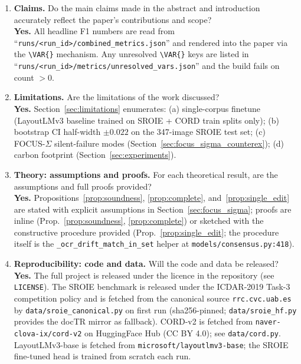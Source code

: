
\begin{enumerate}
\item \textbf{Claims.}  Do the main claims made in the abstract and
introduction accurately reflect the paper's contributions and scope?
\\\textbf{Yes.}  All headline F1 numbers are read from
``\texttt{runs/<run\_id>/combined\_metrics.json}'' and rendered into
the paper via the \texttt{\textbackslash VAR\{\}} mechanism.  Any
unresolved \texttt{\textbackslash VAR\{\}} keys are listed in
``\texttt{runs/<run\_id>/metrics/unresolved\_vars.json}'' and the
build fails on count $> 0$.

\item \textbf{Limitations.}  Are the limitations of the work discussed?
\\\textbf{Yes.}  Section~\ref{sec:limitations} enumerates: (a)
single-corpus finetune (LayoutLMv3 baseline trained on SROIE +
CORD train splits only); (b) bootstrap CI half-width $\pm 0.022$ on
the 347-image SROIE test set; (c) FOCUS-$\Sigma$ silent-failure
modes (Section~\ref{sec:focus_sigma_counterex}); (d) carbon
footprint (Section~\ref{sec:experiments}).

\item \textbf{Theory: assumptions and proofs.}  For each theoretical
result, are the assumptions and full proofs provided?
\\\textbf{Yes.}  Propositions~\ref{prop:soundness},
\ref{prop:complete}, and~\ref{prop:single_edit} are stated with
explicit assumptions in Section~\ref{sec:focus_sigma}; proofs are
inline (Prop.~\ref{prop:soundness}, \ref{prop:complete}) or sketched
with the constructive procedure provided
(Prop.~\ref{prop:single_edit}; the procedure itself is the
\texttt{\_ocr\_drift\_match\_in\_set} helper at
\texttt{models/consensus.py:418}).

\item \textbf{Reproducibility: code and data.}  Will the code and
data be released?
\\\textbf{Yes.}  The full project is released under the licence in
the repository (see \texttt{LICENSE}).  The SROIE benchmark is
released under the ICDAR-2019 Task-3 competition policy and is
fetched from the canonical source \texttt{rrc.cvc.uab.es} by
\texttt{data/sroie\_canonical.py} on first run (sha256-pinned;
\texttt{data/sroie\_hf.py} provides the docTR mirror as fallback).
CORD-v2 is fetched from \texttt{naver-clova-ix/cord-v2} on
HuggingFace Hub (CC BY 4.0); see \texttt{data/cord.py}.
LayoutLMv3-base is fetched from \texttt{microsoft/layoutlmv3-base};
the SROIE fine-tuned head is trained from scratch each run.


\end{enumerate}
